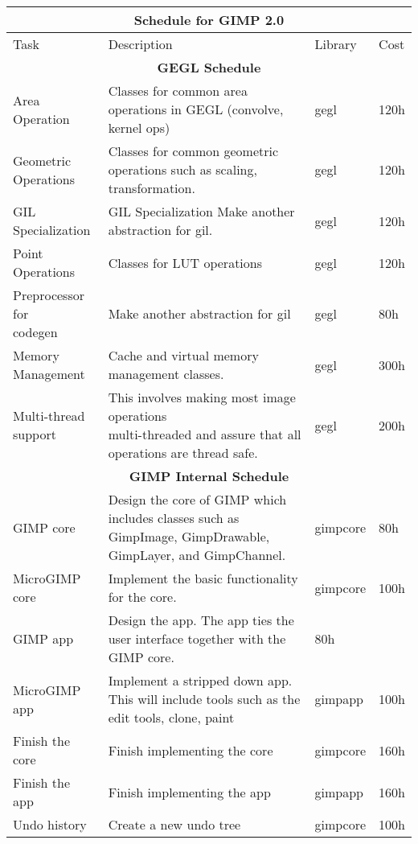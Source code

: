 \begin{flushleft}		
\begin{tabular}{|p{2cm}|p{5cm}|p{2cm}|l|}\hline
\multicolumn{4}{|c|}{\rule[-3mm]{0mm}{8mm} \large \bf Schedule for GIMP 2.0}\\  
\hline
Task & Description & Library & Cost\\ 
\hline 

\multicolumn{4}{|c|}{\bf GEGL Schedule}\\
\hline
Area Operation & Classes for common area operations in GEGL (convolve, kernel ops) & gegl & 120h\\
\hline
\raggedright{Geometric\\ Operations} & Classes for common geometric operations such as scaling, transformation. & gegl & 120h\\
\hline
GIL Specialization & GIL Specialization  Make another abstraction for gil. & gegl & 120h\\
\hline
Point Operations & Classes for LUT operations & gegl & 120h\\
\hline
\raggedright{Preprocessor for\\ codegen} & Make another abstraction for gil & gegl & 80h\\
\hline
\raggedright{Memory \\Management} & \raggedright{Cache and virtual memory management classes.} & gegl & 300h\\
\hline
\raggedright{Multi-thread \\support} & \raggedright{This involves making most image operations \\multi-threaded and assure that all operations are thread safe.} & gegl & 200h\\  
\hline

\multicolumn{4}{|c|}{\bf GIMP Internal Schedule}\\
\hline 
GIMP core & Design the core of GIMP which includes classes such as GimpImage, GimpDrawable, GimpLayer, and GimpChannel. & gimpcore & 80h\\
\hline 
\raggedright{MicroGIMP\\ core} & \raggedright{Implement the basic functionality for the core.} & gimpcore & 100h\\
\hline
GIMP app & Design the app. The app ties the user interface together with the GIMP core. & 80h\\
\hline 
\raggedright{MicroGIMP\\ app} & Implement a stripped down app. This will include tools such as the edit tools, clone, paint & gimpapp & 100h\\
\hline 
\raggedright{Finish the\\ core} & Finish implementing the core & gimpcore & 160h\\
\hline
\raggedright{Finish the \\app} & Finish implementing the app & gimpapp & 160h\\
\hline 
Undo history & Create a new undo tree & gimpcore & 100h\\
\hline
\end{tabular}


\end{flushleft}

